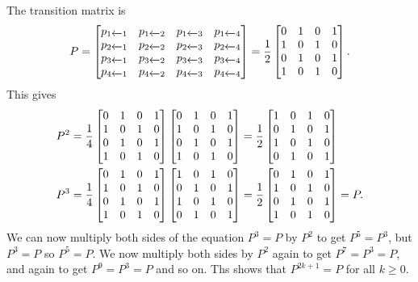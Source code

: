 \documentclass[a4paper]{amsart}
\renewenvironment{solution}{\SolutionInline}{\endSolutionInline}
\begin{document}
\begin{solution}
 The transition matrix is
 \[ P =
     \left[\begin{matrix} 
      p_{1\xleftarrow{}1} & p_{1\xleftarrow{}2} & p_{1\xleftarrow{}3} & p_{1\xleftarrow{}4} \\
      p_{2\xleftarrow{}1} & p_{2\xleftarrow{}2} & p_{2\xleftarrow{}3} & p_{2\xleftarrow{}4} \\
      p_{3\xleftarrow{}1} & p_{3\xleftarrow{}2} & p_{3\xleftarrow{}3} & p_{3\xleftarrow{}4} \\
      p_{4\xleftarrow{}1} & p_{4\xleftarrow{}2} & p_{4\xleftarrow{}3} & p_{4\xleftarrow{}4}
     \end{matrix}\right] = 
     \frac{1}{2}
     \left[\begin{matrix} 
      0 & 1 & 0 & 1 \\
      1 & 0 & 1 & 0 \\
      0 & 1 & 0 & 1 \\
      1 & 0 & 1 & 0
     \end{matrix}\right].
 \]
 This gives
 \begin{align*}
  P^2 &= \frac{1}{4}
     \left[\begin{matrix} 
      0 & 1 & 0 & 1 \\
      1 & 0 & 1 & 0 \\
      0 & 1 & 0 & 1 \\
      1 & 0 & 1 & 0
     \end{matrix}\right]
     \left[\begin{matrix} 
      0 & 1 & 0 & 1 \\
      1 & 0 & 1 & 0 \\
      0 & 1 & 0 & 1 \\
      1 & 0 & 1 & 0
     \end{matrix}\right] 
     = \frac{1}{2} 
     \left[\begin{matrix}
      1 & 0 & 1 & 0 \\
      0 & 1 & 0 & 1 \\
      1 & 0 & 1 & 0 \\
      0 & 1 & 0 & 1
     \end{matrix}\right] \\
  P^3 &= \frac{1}{4}
     \left[\begin{matrix} 
      0 & 1 & 0 & 1 \\
      1 & 0 & 1 & 0 \\
      0 & 1 & 0 & 1 \\
      1 & 0 & 1 & 0
     \end{matrix}\right]
     \left[\begin{matrix}
      1 & 0 & 1 & 0 \\
      0 & 1 & 0 & 1 \\
      1 & 0 & 1 & 0 \\
      0 & 1 & 0 & 1
     \end{matrix}\right] 
     = \frac{1}{2}
     \left[\begin{matrix} 
      0 & 1 & 0 & 1 \\
      1 & 0 & 1 & 0 \\
      0 & 1 & 0 & 1 \\
      1 & 0 & 1 & 0
     \end{matrix}\right] = P.
 \end{align*}
 We can now multiply both sides of the equation $P^3=P$ by $P^2$ to
 get $P^5=P^3$, but $P^3=P$ so $P^5=P$.  We now multiply both sides by
 $P^2$ again to get $P^7=P^3=P$, and again to get $P^9=P^3=P$ and so
 on.  Ths shows that $P^{2k+1}=P$ for all $k\geq 0$.


\end{solution}
\end{document}
